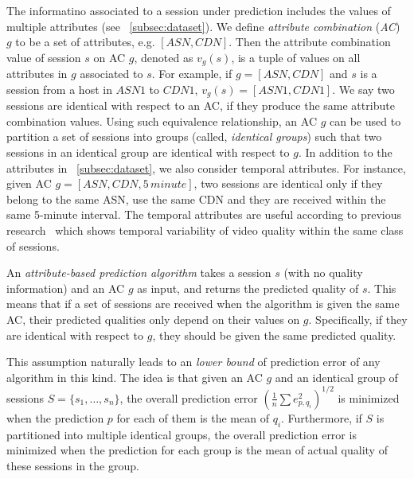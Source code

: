  The informatino associated to a session under prediction includes the values of multiple attributes (see \Section~\ref{subsec:dataset}). We define {\it attribute combination} ({\it AC}) $g$ to be a set of attributes, e.g. $[ASN, CDN]$. Then the attribute combination value of session $s$ on AC $g$, denoted as $v_g(s)$, is a tuple of values on all attributes in $g$ associated to $s$. For example, if $g=[ASN,CDN]$ and $s$ is a session from a host in $ASN1$ to $CDN1$, $v_g(s)=[ASN1, CDN1]$. We say two sessions are identical with respect to an AC, if they produce the same attribute combination values. Using such equivalence relationship, an AC $g$ can be used to partition a set of sessions into groups (called, {\it identical groups}) such that two sessions in an identical group are identical with respect to $g$.
In addition to the attributes in \Section~\ref{subsec:dataset}, we also consider temporal attributes. For instance, given AC $g=[ASN, CDN, 5\,minute]$, two sessions are identical only if they belong to the same ASN, use the same CDN and they are received within the same 5-minute interval. The temporal attributes are useful according to previous research~\cite{sigcomm12} which shows temporal variability of video quality within the same class of sessions.

An {\it attribute-based prediction algorithm} takes a session $s$ (with no quality information) and an AC $g$ as input, and returns the predicted quality of $s$. This means that if a set of sessions are received when the algorithm is given the same AC, their predicted qualities only depend on their values on $g$. Specifically, if they are identical with respect to $g$, they should be given the same predicted quality. 


This assumption naturally leads to an {\it lower bound} of prediction error of any algorithm in this kind. 
The idea is that given an AC $g$ and an identical group of sessions $S=\{s_1,\dots,s_n\}$, the overall prediction error $\left(\frac{1}{n}\sum e_{p,q_i}^2\right)^{1/2}$ is minimized when the prediction $p$ for each of them is the mean of $q_i$. Furthermore, if $S$ is partitioned into multiple identical groups,  the overall prediction error is minimized when the prediction for each group is the mean of actual quality of these sessions in the group. 

